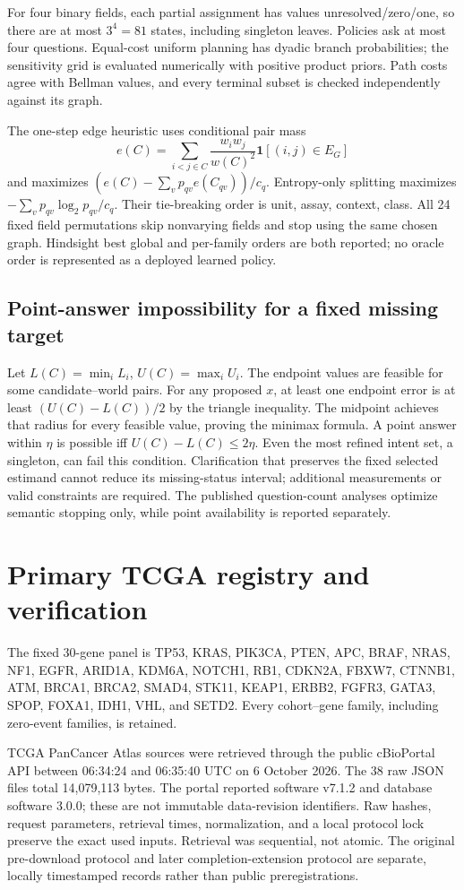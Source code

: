 \documentclass[10pt,letterpaper]{article}
\begin{document}
For four binary fields, each partial assignment has values unresolved/zero/one, so there are at most $3^4=81$ states, including singleton leaves. Policies ask at most four questions. Equal-cost uniform planning has dyadic branch probabilities; the sensitivity grid is evaluated numerically with positive product priors. Path costs agree with Bellman values, and every terminal subset is checked independently against its graph.

The one-step edge heuristic uses conditional pair mass
\[
 e(C)=\sum_{i<j\in C}\frac{w_iw_j}{w(C)^2}\mathbf1[(i,j)\in E_G]
\]
and maximizes $(e(C)-\sum_vp_{qv}e(C_{qv}))/c_q$. Entropy-only splitting maximizes $-\sum_vp_{qv}\log_2p_{qv}/c_q$. Their tie-breaking order is unit, assay, context, class. All 24 fixed field permutations skip nonvarying fields and stop using the same chosen graph. Hindsight best global and per-family orders are both reported; no oracle order is represented as a deployed learned policy.

\subsection{Point-answer impossibility for a fixed missing target}
Let $L(C)=\min_iL_i$, $U(C)=\max_iU_i$. The endpoint values are feasible for some candidate--world pairs. For any proposed $x$, at least one endpoint error is at least $(U(C)-L(C))/2$ by the triangle inequality. The midpoint achieves that radius for every feasible value, proving the minimax formula. A point answer within $\eta$ is possible iff $U(C)-L(C)\leq2\eta$. Even the most refined intent set, a singleton, can fail this condition. Clarification that preserves the fixed selected estimand cannot reduce its missing-status interval; additional measurements or valid constraints are required. The published question-count analyses optimize semantic stopping only, while point availability is reported separately.

\section{Primary TCGA registry and verification}
The fixed 30-gene panel is TP53, KRAS, PIK3CA, PTEN, APC, BRAF, NRAS, NF1, EGFR, ARID1A, KDM6A, NOTCH1, RB1, CDKN2A, FBXW7, CTNNB1, ATM, BRCA1, BRCA2, SMAD4, STK11, KEAP1, ERBB2, FGFR3, GATA3, SPOP, FOXA1, IDH1, VHL, and SETD2. Every cohort--gene family, including zero-event families, is retained.

TCGA PanCancer Atlas sources \cite{cerami,gao,hoadley} were retrieved through the public cBioPortal API between 06:34:24 and 06:35:40 UTC on 6 October 2026. The 38 raw JSON files total 14,079,113 bytes. The portal reported software v7.1.2 and database software 3.0.0; these are not immutable data-revision identifiers. Raw hashes, request parameters, retrieval times, normalization, and a local protocol lock preserve the exact used inputs. Retrieval was sequential, not atomic. The original pre-download protocol and later completion-extension protocol are separate, locally timestamped records rather than public preregistrations.
\end{document}

